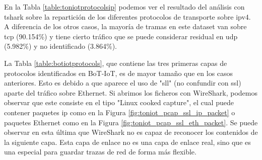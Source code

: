 En la Tabla \ref{table:toniotprotocolsip} podemos ver el resultado del análisis con tshark sobre la repartición de los diferentes protocolos de transporte sobre \acrshort{ipv4}. A diferencia de los otros casos, la mayoría de tramas en este dataset van sobre \acrshort{tcp} (90.154\%) y tiene cierto tráfico que se puede considerar residual en \acrshort{udp} (5.982\%) y no identificado (3.864\%).



La Tabla \ref{table:botiotprotocols}, que contiene las tres primeras capas de protocolos identificados en BoT-IoT, es de mayor tamaño que en los casos anteriores. Esto es debido a que aparece el uso de "sll" (no confundir con \acrshort{ssl}) aparte del tráfico sobre Ethernet. Si abrimos los ficheros con WireShark, podemos observar que este consiste en el tipo "Linux cooked capture", el cual puede contener paquetes \acrshort{ip} como en la Figura \ref{fig:toniot_pcap_ssl_ip_packet} o paquetes Ethernet como en la Figura \ref{fig:toniot_pcap_ssl_eth_packet}. Se puede observar en esta última que WireShark no es capaz de reconocer los contenidos de la siguiente capa. Esta capa de enlace no es una capa de enlace real, sino que es una especial para guardar trazas de red de forma más flexible. 

